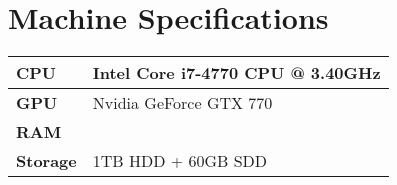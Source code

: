 \chapter{Machine Specifications} \label{AppendixD}

\begin{longtable}{|p{8cm}|p{8cm}|}
	    \hline
	    \textbf{CPU} & Intel Core i7-4770 CPU @ 3.40GHz\\
	    \hline
	    \textbf{GPU} & Nvidia GeForce GTX 770\\
	    \hline
	    \textbf{RAM} & \\
	    \hline
	    \textbf{Storage} & 1TB HDD + 60GB SDD\\
	    \hline
\end{longtable}